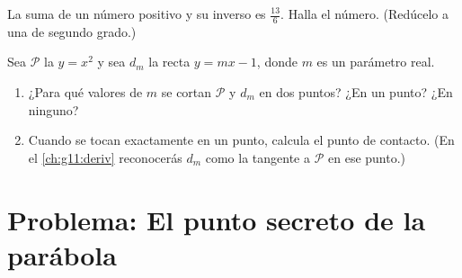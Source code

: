 \begin{exercise}[$\star\star$]\label{exo:g11:quad:10}
La suma de un número positivo y su inverso es $\frac{13}{6}$. Halla el
número. (Redúcelo a una  de segundo grado.)
\end{exercise}

\begin{exercise}[$\star\star\star$]\label{exo:g11:quad:11}
Sea $\mathcal P$ la  $y = x^2$ y sea $d_m$ la recta $y = mx - 1$,
donde $m$ es un parámetro real.
\begin{enumerate}
  \item ¿Para qué valores de $m$ se cortan $\mathcal P$ y $d_m$ en dos
        puntos? ¿En un punto? ¿En ninguno?
  \item Cuando se tocan exactamente en un punto, calcula el punto de
        contacto. (En el \cref{ch:g11:deriv} reconocerás $d_m$ como la
        tangente a $\mathcal P$ en ese punto.)
\end{enumerate}
\end{exercise}

\section{Problema: El punto secreto de la parábola}

